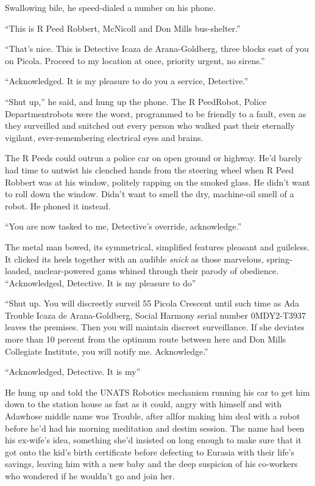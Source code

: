 Swallowing bile, he speed-dialed a number on his phone.

“This is R Peed Robbert, McNicoll and Don Mills bus-shelter.”

“That’s nice. This is Detective Icaza de Arana-Goldberg, three
blocks east of you on Picola. Proceed to my location at once,
priority urgent, no sirens.”

“Acknowledged. It is my pleasure to do you a service, Detective.”

“Shut up,” he said, and hung up the phone. The R Peed{\dash}Robot, Police
Department{\dash}robots were the worst, programmed to be friendly to a
fault, even as they surveilled and snitched out every person who
walked past their eternally vigilant, ever-remembering electrical
eyes and brains.

The R Peeds could outrun a police car on open ground or highway.
He’d barely had time to untwist his clenched hands from the
steering wheel when R Peed Robbert was at his window, politely
rapping on the smoked glass. He didn’t want to roll down the
window. Didn’t want to smell the dry, machine-oil smell of a robot.
He phoned it instead.

“You are now tasked to me, Detective’s override, acknowledge.”

The metal man bowed, its symmetrical, simplified features pleasant
and guileless. It clicked its heels together with an audible
\emph{snick} as those marvelous, spring-loaded, nuclear-powered
gams whined through their parody of obedience. “Acknowledged,
Detective. It is my pleasure to do{\dash}”

“Shut up. You will discreetly surveil 55 Picola Crescent until such
time as Ada Trouble Icaza de Arana-Goldberg, Social Harmony serial
number 0MDY2-T3937 leaves the premises. Then you will maintain
discreet surveillance. If she deviates more than 10 percent from
the optimum route between here and Don Mills Collegiate Institute,
you will notify me. Acknowledge.”

“Acknowledged, Detective. It is my{\dash}”

He hung up and told the UNATS Robotics mechanism running his car to
get him down to the station house as fast as it could, angry with
himself and with Ada{\dash}whose middle name was Trouble, after all{\dash}for
making him deal with a robot before he’d had his morning meditation
and destim session. The name had been his ex-wife’s idea, something
she’d insisted on long enough to make sure that it got onto the
kid’s birth certificate before defecting to Eurasia with their
life’s savings, leaving him with a new baby and the deep suspicion
of his co-workers who wondered if he wouldn’t go and join her.

